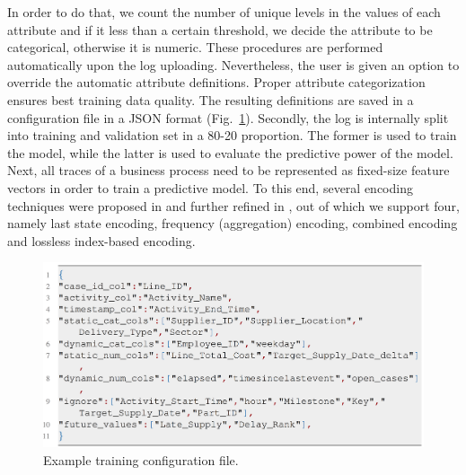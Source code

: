 \documentclass[runningheads,a4paper]{llncs}
\begin{document}

In order to do that, we count the number of unique levels in the values of each attribute and if it less than a certain threshold, we decide the attribute to be categorical, otherwise it is numeric. These procedures are performed automatically upon the log uploading. Nevertheless, the user is given an option to override the automatic attribute definitions. Proper attribute categorization ensures best training data quality. 
The resulting definitions are saved in a configuration file in a JSON format (Fig.~\ref{fig:listing}). Secondly, the log is internally split into training and validation set in a 80-20 proportion. The former is used to train the model, while the latter is used to evaluate the predictive power of the model. Next, all traces of a business process need to be represented as fixed-size feature vectors in order to train a predictive model. To this end, several encoding techniques were proposed in \cite{Leontjeva2015} and further refined in \cite{Teinemaa2017}, out of which we support four, namely last state encoding, frequency (aggregation) encoding, combined encoding and lossless index-based encoding. 
\begin{figure}[htp!]%
	\centering
	 \includegraphics[width=.7\textwidth]{img/Listing}
	\caption{Example training configuration file.}
	\label{fig:listing}
	\vspace{-\baselineskip}
\end{figure}
\end{document}
